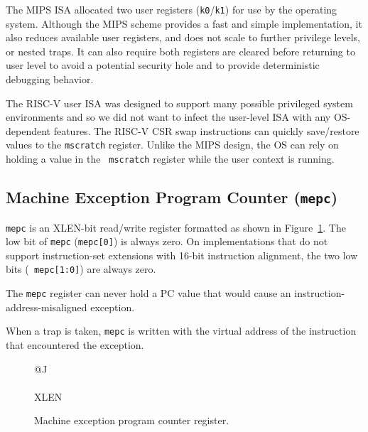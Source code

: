 \begin{commentary}
The MIPS ISA allocated two user registers ({\tt k0}/{\tt k1}) for use
by the operating system.  Although the MIPS scheme provides a fast and
simple implementation, it also reduces available user registers,  and
does not scale to further privilege levels, or nested traps.  It can
also require both registers are cleared before returning to user level
to avoid a potential security hole and to provide deterministic
debugging behavior.

The RISC-V user ISA was designed to support many possible privileged
system environments and so we did not want to infect the user-level
ISA with any OS-dependent features.  The RISC-V CSR swap instructions
can quickly save/restore values to the {\tt mscratch} register.
Unlike the MIPS design, the OS can rely on holding a value in the {\tt
  mscratch} register while the user context is running.
\end{commentary}

\subsection{Machine Exception Program Counter ({\tt mepc})}

{\tt mepc} is an XLEN-bit read/write register formatted as shown in
Figure~\ref{mepcreg}.  The low bit of {\tt mepc} ({\tt mepc[0]}) is
always zero.  On implementations that do not support instruction-set
extensions with 16-bit instruction alignment, the two low bits ({\tt
  mepc[1:0]}) are always zero.

\begin{commentary}
The {\tt mepc} register can never hold a PC value that would cause an
instruction-address-misaligned exception.
\end{commentary}

When a trap is taken, {\tt mepc} is written with the virtual address
of the instruction that encountered the exception.

\begin{figure}[h!]
{\footnotesize
\begin{center}
\begin{tabular}{@{}J}
 \\
\hline
{} \\
\hline
XLEN \\
\end{tabular}
\end{center}
}
\vspace{-0.1in}
\caption{Machine exception program counter register.}
\label{mepcreg}
\end{figure}

